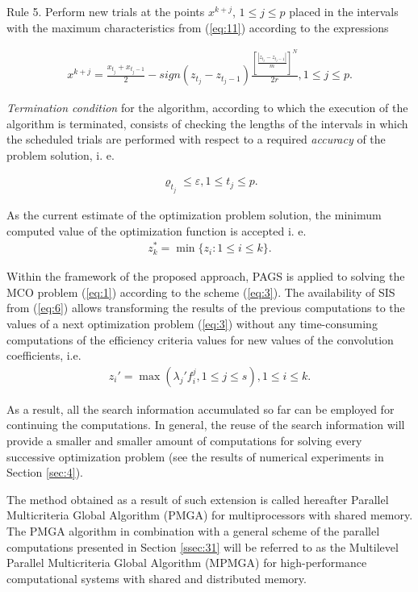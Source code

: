 Rule 5. Perform new trials at the points $x^{k+j}$, $1 \leq j \leq p$ placed in the intervals with the maximum characteristics from (\ref{eq:11}) according to the expressions 

\begin{eqnarray} \label{eq:12}
	x^{k+j} = \frac{x_{t_j} + x_{t_j-1}}{2}
	- sign(z_{t_j} - z_{t_j-1}) \frac{[\frac{|z_{t_j} - z_{t_j-1}|}{m}]^N}{2r} , 1\leq j \leq p.
\end{eqnarray}

\textit{Termination condition} for the algorithm, according to which the execution of the algorithm is terminated, consists of checking the lengths of the intervals in which the scheduled trials are performed with respect to a required \textit{accuracy} of the problem solution, i. e.

\begin{eqnarray} \label{eq:13}
\varrho_{t_j} \leq \varepsilon, 1 \leq t_j \leq p.
\end{eqnarray}

As the current estimate of the optimization problem solution, the minimum computed value of the optimization function is accepted i. e.
\begin{eqnarray} \label{eq:14}
z_k^*=\min⁡{\{z_i:1\leq i \leq k\}}.
\end{eqnarray}

Within the framework of the proposed approach, PAGS is applied to solving the MCO problem (\ref{eq:1}) according to the scheme (\ref{eq:3}). The availability of SIS from (\ref{eq:6}) allows transforming the results of the previous computations to the values of a next optimization problem (\ref{eq:3}) without any time-consuming computations of the efficiency criteria values for new values of the convolution coefficients, i.e.
\begin{eqnarray} \label{eq:15}
z_i'=\max{⁡(\lambda_j' f_i^j,1\leq j \leq s)},1 \leq i \leq k.
\end{eqnarray}

As a result, all the search information accumulated so far can be employed for continuing the computations. In general, the reuse of the search information will provide a smaller and smaller amount of computations for solving every successive optimization problem (see the results of numerical experiments in Section \ref{sec:4}).

The method obtained as a result of such extension is called hereafter Parallel Multicriteria Global Algorithm (PMGA) for multiprocessors with shared memory. The PMGA algorithm in combination with a general scheme of the parallel computations presented in Section \ref{ssec:31} will be referred to as the Multilevel Parallel Multicriteria Global Algorithm (MPMGA) for high-performance computational systems with shared and distributed memory.

